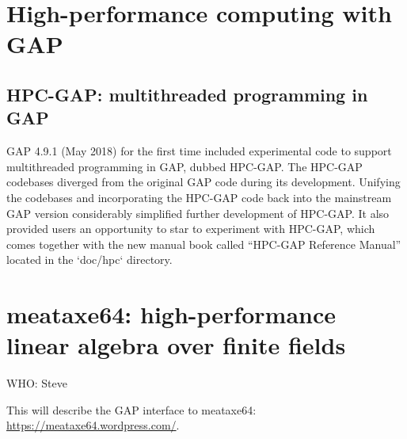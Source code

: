 \documentclass{deliverablereport}
\begin{document}




\section{High-performance computing with GAP}

\subsection{HPC-GAP: multithreaded programming in GAP}

GAP 4.9.1 (May 2018) for the first time included experimental code to 
support multithreaded programming in GAP, dubbed HPC-GAP. The HPC-GAP 
codebases diverged from the original GAP code during its development. 
Unifying the codebases and incorporating the HPC-GAP code back into the 
mainstream GAP version considerably simplified further development of 
HPC-GAP. It also provided users an opportunity to star to experiment 
with HPC-GAP, which comes together with the new manual book called 
``HPC-GAP Reference Manual'' located in the `doc/hpc` directory.




\section{meataxe64: high-performance linear algebra over finite fields}

WHO: Steve

This will describe the GAP interface to meataxe64: \url{https://meataxe64.wordpress.com/}.

\end{document}
